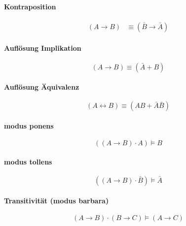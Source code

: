 \documentclass[../main.tex]{subfiles}
\begin{document}
        \paragraph{Kontraposition}
            \begin{align}
                (A \rightarrow B) &\equiv (\bar{B} \rightarrow \bar{A})
            \end{align}
        
        \paragraph{Auflösung Implikation}
            \begin{equation}
                (A \rightarrow B) \equiv (\bar{A} + B)
            \end{equation}
        
        \paragraph{Auflösung Äquivalenz}
            \begin{equation}
                (A \leftrightarrow B) \equiv (AB + \bar{A}\bar{B})
            \end{equation}
        
        \paragraph{modus ponens}
            \begin{equation}
                ((A \rightarrow B) \cdot A) \models B
            \end{equation}
        
        \paragraph{modus tollens}
            \begin{equation}
                ((A \rightarrow B) \cdot \bar{B}) \models \bar{A}
            \end{equation}
        
        \paragraph{Transitivität (modus barbara)}
            \begin{equation}
                (A \rightarrow B) \cdot (B \rightarrow C) \models (A \rightarrow C)
            \end{equation}
\end{document}

